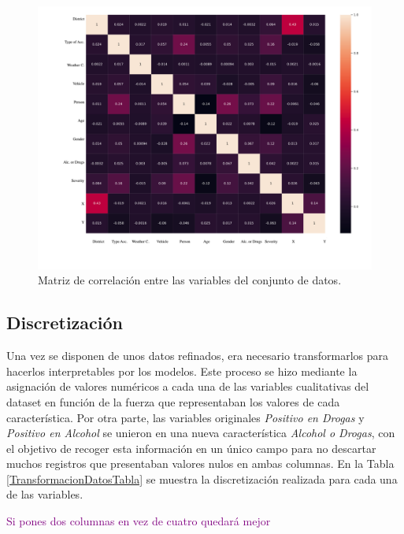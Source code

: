 \documentclass{uathesis-es}
\begin{document}
{ \begin{figure}[H]
    \centering
    \includegraphics[width=14cm]{Figures/1stPaper/CorrelationMatrix.png}
    \caption{Matriz de correlación entre las variables del conjunto de datos.}
    \label{CorrelationMatrix}
\end{figure}


\subsection*{Discretización}

Una vez se disponen de unos datos refinados, era necesario transformarlos para hacerlos interpretables por los modelos. Este proceso se hizo mediante la asignación de valores numéricos a cada una de las variables cualitativas del dataset en función de la fuerza que representaban los valores de cada característica. Por otra parte, las variables originales \textit{Positivo en Drogas} y \textit{Positivo en Alcohol} se unieron en una nueva característica \textit{Alcohol o Drogas}, con el objetivo de recoger esta información en un único campo para no descartar muchos registros que presentaban valores nulos en ambas columnas. En la Tabla \ref{TransformacionDatosTabla} se muestra la discretización realizada para cada una de las variables.

\textcolor{purple}{Si pones dos columnas en vez de cuatro quedará mejor}
\begin{table}[ht]
    \centering
    \renewcommand{\arraystretch}{1.2}
    \small


\end{table}}
\end{document}
